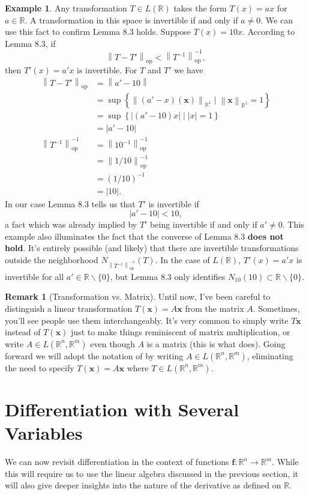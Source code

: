 \documentclass{article}
\newcommand{\R}{\mathbb{R}}
\newcommand{\x}{\mathbf{x}}
\newcommand{\f}{\mathbf{f}}
\newcommand{\norm}[1]{\left\lVert#1\right\rVert}
\newcommand{\normop}[1]{\left\lVert#1\right\rVert_\text{op}}
\theoremstyle{definition}
\newtheorem{example}{Example}[section]
\newtheorem{remark}{Remark}[section]
\begin{document}
	\begin{example}
		Any transformation $ T\in L(\R) $ takes the form $ T(x)=ax $ for $ a\in \R $. A transformation in this space is invertible if and only if $ a\neq 0 $. We can use this fact to confirm Lemma 8.3 holds. Suppose $ T(x)= 10x $. According to Lemma 8.3, if $$\normop{T-T'}<\normop{T^{-1}}^{-1}   ,$$ then $ T'(x)=a'x $ is invertible. For $ T $ and $ T' $ we have 
		\begin{align*}
			\normop{T-T'} & = \norm{a' - 10}\\ & =  \sup\left\{\norm{(a'-x)(\x)}_{\R^1}\mid \norm{\x}_{\R^1} = 1\right\} \\
			& =  \sup\left\{|(a'-10)x|\mid |x|=1\right\}\\ & = |a'-10|\\
			\normop{T^{-1}}^{-1} & = \normop{10^{-1}}^{-1} \\
			& = \normop{1/10}^{-1} \\
			& = (1/10)^{-1}\\
			& = |10|. 
		\end{align*}
		In our case Lemma 8.3 tells us that $ T' $ is invertible if $$ |a' - 10| < 10,$$ a fact which was already implied by $ T' $ being invertible if and only if $ a'\neq 0 $. This example also illuminates the fact that the converse of Lemma 8.3 \textbf{does not hold}. It's entirely possible (and likely) that there are invertible transformations outside the neighborhood $N_{\normop{T^{-1}}^{-1}}(T) $. In the case of $ L(\R) $, $ T'(x)=a'x $ is invertible for all $ a'\in \R\backslash\{0\} $, but Lemma 8.3 only identifies $ N_{10}(10)\subset\R\backslash\{0\}  $.  
	\end{example}
	\begin{remark}[Transformation vs. Matrix]
		Until now, I've been careful to distinguish a linear transformation $ T(\x)=A\x $ from the matrix $ A $. Sometimes, you'll see people use them interchangeably. It's very common to simply write $ T\x $ instead of $ T(\x) $ just to make things reminiscent of matrix multiplication, or write $ A\in L(\R^n, \R^m) $ even though $ A $ is a matrix (this is what \cite{rudin1964principles} does). Going forward we will adopt the notation of  \cite{rudin1964principles}  by writing $ A\in L(\R^n,\R^m) $, eliminating the need to specify $ T(\x)=A\x $ where $ T\in L(\R^n,\R^m) $. 
	\end{remark}
	\section{Differentiation with Several Variables}
	We can now revisit differentiation in the context of functions $ \f:\R^n\to\R^m $. While this will require us to use the linear algebra discussed in the previous section, it will also give deeper insights into the nature of the derivative as defined on $ \R $. 
\end{document}
